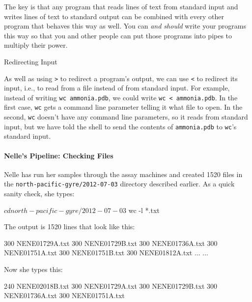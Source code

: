 \documentclass{book}
\begin{document}
The key is that any program that reads lines of text from standard input
and writes lines of text to standard output can be combined with every
other program that behaves this way as well. You can \emph{and should}
write your programs this way so that you and other people can put those
programs into pipes to multiply their power.

\begin{swcbox}{Redirecting Input}

As well as using \texttt{\textgreater{}} to redirect a program's output,
we can use \texttt{\textless{}} to redirect its input, i.e., to read
from a file instead of from standard input. For example, instead of
writing \texttt{wc ammonia.pdb}, we could write
\texttt{wc \textless{} ammonia.pdb}. In the first case, \texttt{wc} gets
a command line parameter telling it what file to open. In the second,
\texttt{wc} doesn't have any command line parameters, so it reads from
standard input, but we have told the shell to send the contents of
\texttt{ammonia.pdb} to \texttt{wc}'s standard input.

\end{swcbox}

\mbox{}\paragraph{Nelle's Pipeline: Checking Files}

Nelle has run her samples through the assay machines and created 1520
files in the \texttt{north-pacific-gyre/2012-07-03} directory described
earlier. As a quick sanity check, she types:

\begin{VerbIn}
$ cd north-pacific-gyre/2012-07-03
$ wc -l *.txt
\end{VerbIn}

The output is 1520 lines that look like this:

\begin{VerbOut}
300 NENE01729A.txt
300 NENE01729B.txt
300 NENE01736A.txt
300 NENE01751A.txt
300 NENE01751B.txt
300 NENE01812A.txt
... ...
\end{VerbOut}

Now she types this:


\begin{VerbOut}
 240 NENE02018B.txt
 300 NENE01729A.txt
 300 NENE01729B.txt
 300 NENE01736A.txt
 300 NENE01751A.txt
\end{VerbOut}
\end{document}
